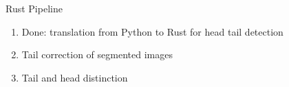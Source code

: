 




\begin{frame}{Rust Pipeline}
    \begin{enumerate}
        \item Done: translation from Python to Rust for head tail detection
        \item Tail correction of segmented images
        \item Tail and head distinction
    \end{enumerate}
\end{frame}

